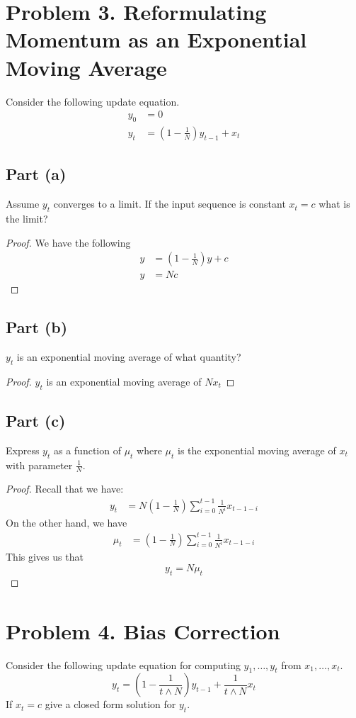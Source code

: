 \documentclass{amsart}
\theoremstyle{definition}
\begin{document}
\section*{Problem 3. Reformulating Momentum as an Exponential Moving Average}
Consider the following update equation.
\begin{align*}
    y_0 &= 0 \\
    y_t &= \left(1 - \frac1{N}\right)y_{t - 1} + x_t
\end{align*}
\subsection*{Part (a)}
Assume $y_t$ converges to a limit. If the input sequence is constant $x_t = c$ what is the limit?
\begin{proof}
    We have the following
    \begin{align*}
        y &= \left(1 - \frac1{N}\right) y + c \\
        y &= N c
    \end{align*}
\end{proof}

\subsection*{Part (b)} $y_t$ is an exponential moving average of what quantity?

\begin{proof}
$y_t$ is an exponential moving average of $N x_t$   
\end{proof}

\subsection*{Part (c)} Express $y_t$ as a function of $\mu_t$ where $\mu_t$ is the exponential moving average of $x_t$ with parameter $\frac1{N}$. 

\begin{proof}
    Recall that we have:
    \begin{align*}
        y_t &= N\left(1 - \frac1{N}\right) \sum_{i = 0}^{t - 1} \frac1{N^i}  x_{t - 1 - i} 
    \end{align*}
    On the other hand, we have
    \begin{align*}
        \mu_t &= \left(1 - \frac1{N}\right) \sum_{i = 0}^{t - 1} \frac1{N^i} x_{t - 1 - i} 
    \end{align*}
    This gives us that 
    \[
    y_t = N \mu_t
    \]
\end{proof}

\section*{Problem 4. Bias Correction}
Consider the following update equation for computing $y_1, \ldots, y_t$ from $x_1, \ldots, x_t$.
\[
y_t = \left(
    1 - \frac1{
        t \land N
    }
\right) y_{t - 1} + \frac1{
    t \land N
} x_t
\]
If $x_t = c$ give a closed form solution for $y_t$. 
\end{document}
